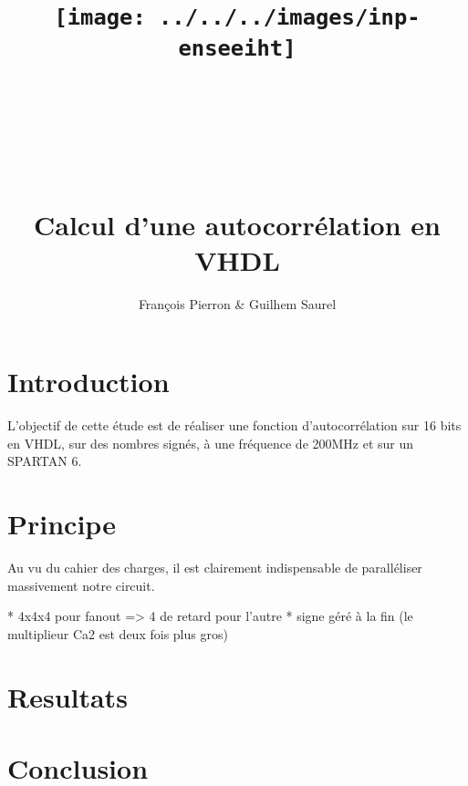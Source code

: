 \documentclass{article}
\title{\texttt{[image: ../../../images/inp-enseeiht]} \\ ~ \\ ~ \\ ~ \\ ~ \\ Calcul d’une autocorrélation en VHDL}
\author{François Pierron \& Guilhem Saurel}
\date{\oldstylenums{\today}}
\begin{document}
\begin{titlepage}
    \setcounter{page}{0}
    \maketitle
    \vfill
    \tableofcontents
    \thispagestyle{empty}
\end{titlepage}

\section{Introduction}

L’objectif de cette étude est de réaliser une fonction d’autocorrélation sur 16 bits en VHDL, sur des nombres signés, à une fréquence de 200MHz et sur un SPARTAN 6.

\section{Principe}

Au vu du cahier des charges, il est clairement indispensable de paralléliser massivement notre circuit.

* 4x4x4 pour fanout => 4 de retard pour l’autre
* signe géré à la fin (le multiplieur Ca2 est deux fois plus gros)

\section{Resultats}

\section{Conclusion}
\end{document}
